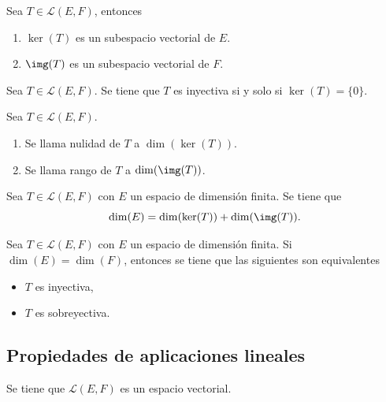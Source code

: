 \documentclass[a4,11pt]{aleph-notas}
\begin{document}
\begin{teo}
    Sea $T \in \mathcal{L}(E,F)$, entonces
    \begin{enumerate}
    \item 
        $\ker(T)$ es un subespacio vectorial de $E$.
    \item 
        $\img(T)$ es un subespacio vectorial de $F$.
    \end{enumerate}
\end{teo}
    
\begin{teo}
    Sea $T \in \mathcal{L}(E,F)$. Se tiene que $T$ es inyectiva si y solo si $\ker(T)=\{0\}$.
\end{teo}

\begin{defi}
    Sea $T \in \mathcal{L}(E,F)$.
    \begin{enumerate}
    \item 
        Se llama nulidad de $T$ a $\dim(\ker(T))$.
    \item 
        Se llama rango de $T$ a $\dim(\img(T))$.
    \end{enumerate}
\end{defi}

\begin{teo}
    Sea $T \in \mathcal{L}(E,F)$ con $E$ un espacio de dimensión finita. Se tiene que
    \[
        \dim(E) = \dim(\ker(T)) +  \dim(\img(T)).
    \]
\end{teo}   

\begin{teo}
    Sea $T \in \mathcal{L}(E,F)$ con $E$ un espacio de dimensión finita. Si $\dim(E)=\dim(F)$, entonces se tiene que las siguientes son equivalentes
    \begin{itemize}
        \item $T$ es inyectiva,
        \item $T$ es sobreyectiva.
    \end{itemize}
\end{teo}   

\subsection{Propiedades de aplicaciones lineales}

\begin{teo}
    Se tiene que $\mathcal{L}(E,F)$ es un espacio vectorial.
\end{teo}
\end{document}
